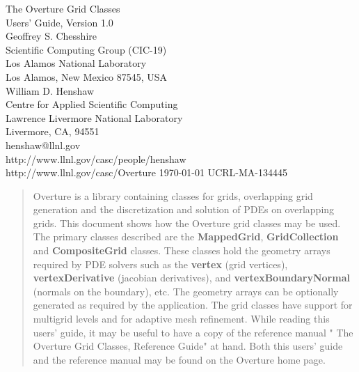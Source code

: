 \documentclass{article}
\begin{document}
\begin{titlepage}
\begin{center}
 ~~ \\
 ~~ \\
 ~~ \\
 ~~ \\
 ~~ \\
{\Large The Overture Grid Classes \\
        Users' Guide, Version 1.0} \\
\vspace{ 2\baselineskip}
Geoffrey S. Chesshire \\
\vspace{\baselineskip}
Scientific Computing Group (CIC-19) \\
Los Alamos National Laboratory \\
Los Alamos, New Mexico 87545, USA \\
\vspace{2\baselineskip}
William D. Henshaw \\
\vspace{\baselineskip}
Centre for Applied Scientific Computing \\
Lawrence Livermore National Laboratory    \\
Livermore, CA, 94551   \\
henshaw@llnl.gov \\
http://www.llnl.gov/casc/people/henshaw \\
http://www.llnl.gov/casc/Overture 
\vspace{\baselineskip}
\today
\vspace{\baselineskip}
UCRL-MA-134445
\end{center}

\vspace{ 8\baselineskip}
\begin{abstract}

Overture is a library containing classes for grids, overlapping grid
generation and the discretization and solution of PDEs on overlapping
grids.  This document shows how the Overture grid classes may be used.
 The primary
classes described are the {\bf MappedGrid}, {\bf GridCollection} and {\bf CompositeGrid} classes.
These classes hold the geometry arrays required by PDE solvers such as the {\bf vertex} (grid vertices),
{\bf vertexDerivative} (jacobian derivatives), and {\bf vertexBoundaryNormal} (normals
on the boundary), etc. The geometry arrays can be optionally generated as required by
the application. The grid classes have support for multigrid levels and for adaptive mesh refinement.
While reading this users' guide, it may be useful to have a copy of
the reference manual " The Overture Grid Classes, Reference Guide" at hand.  Both
this users' guide and the reference manual may be found on the Overture home page.

\end{abstract}
\end{titlepage}
\end{document}
